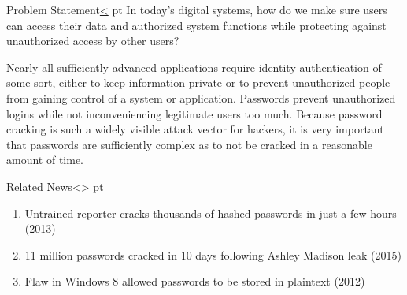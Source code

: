 \documentclass[12pt]{extarticle}
\newenvironment{instructionblock}{\Large\bgroup}{\egroup}
\begin{document}
	
	\pagebreak
	\setcounter{section}{1}
	
	\pagebreak
	\begin{slide}{Problem Statement}{\hyperref[slide 2]{\textless}}
		 pt
		\begin{instructionblock}
			In today's digital systems, how do we make sure users can access their data and authorized system functions while protecting against unauthorized access by other users?
		\end{instructionblock}
	\end{slide}
	
	Nearly all sufficiently advanced applications require identity authentication of some sort, either to keep information private or to prevent unauthorized people from gaining control of a system or application. Passwords prevent unauthorized logins while not inconveniencing legitimate users too much. Because password cracking is such a widely visible attack vector for hackers, it is very important that passwords are sufficiently complex as to not be cracked in a reasonable amount of time. 
	
	
	
	\pagebreak
	\begin{slide}{Related News}{\hyperref[slide 1]{\textless}\hyperref[slide 3]{\textgreater}}
		 pt
		\begin{instructionblock}
			\begin{enumerate}
				\item Untrained reporter cracks thousands of hashed passwords in just a few hours (2013) \cite{ars}
				\item 11 million passwords cracked in 10 days following Ashley Madison leak (2015) \cite{ashley}
				\item Flaw in Windows 8 allowed passwords to be stored in plaintext (2012) \cite{msft}
			\end{enumerate}
		\end{instructionblock}
	\end{slide}
	
\end{document}
